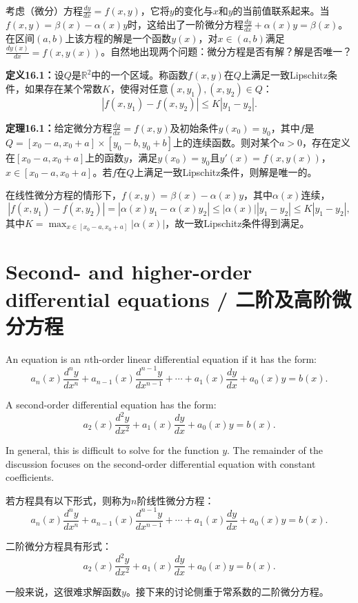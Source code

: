 \begin{translation}
考虑（微分）方程$\frac{dy}{dx} = f(x, y)$，它将$y$的变化与$x$和$y$的当前值联系起来。当$f(x, y) = \beta(x) - \alpha(x) y$时，这给出了一阶微分方程$\frac{dy}{dx} + \alpha(x)y = \beta(x)$。在区间$(a, b)$上该方程的解是一个函数$y(x)$，对$x \in (a, b)$满足$\frac{d y(x)}{dx} = f(x, y(x))$。自然地出现两个问题：微分方程是否有解？解是否唯一？

\textbf{定义16.1：}设$Q$是$\mathbb{R}^2$中的一个区域。称函数$f(x, y)$在$Q$上满足一致Lipschitz条件，如果存在某个常数$K$，使得对任意$(x, y_1), (x, y_2) \in Q$：
\[
|f(x, y_1) - f(x, y_2)| \leq K |y_1 - y_2|.
\]

\textbf{定理16.1：}给定微分方程$\frac{dy}{dx} = f(x, y)$及初始条件$y(x_0) = y_0$，其中$f$是$Q = [x_0 - a, x_0 + a] \times [y_0 - b, y_0 + b]$上的连续函数。则对某个$a > 0$，存在定义在$[x_0 - a, x_0 + a]$上的函数$y$，满足$y(x_0) = y_0$且$y'(x) = f(x, y(x))$，$x \in [x_0 - a, x_0 + a]$。若$f$在$Q$上满足一致Lipschitz条件，则解是唯一的。

在线性微分方程的情形下，$f(x, y) = \beta(x) - \alpha(x)y$，其中$\alpha(x)$连续，
\[
|f(x, y_1) - f(x, y_2)| = |\alpha(x)y_1 - \alpha(x)y_2| \leq |\alpha(x)| |y_1 - y_2| \leq K |y_1 - y_2|,
\]
其中$K = \max_{x \in [x_0-a, x_0+a]} |\alpha(x)|$，故一致Lipschitz条件得到满足。
\end{translation}

\section{Second- and higher-order differential equations / 二阶及高阶微分方程}

\begin{original}
An equation is an $n$th-order linear differential equation if it has the form:
\[
a_n(x)\frac{d^n y}{dx^n} + a_{n-1}(x)\frac{d^{n-1} y}{dx^{n-1}} + \cdots + a_1(x)\frac{dy}{dx} + a_0(x)y = b(x).
\]

A second-order differential equation has the form:
\[
a_2(x)\frac{d^2 y}{dx^2} + a_1(x)\frac{dy}{dx} + a_0(x)y = b(x).
\]

In general, this is difficult to solve for the function $y$. The remainder of the discussion focuses on the second-order differential equation with constant coefficients.
\end{original}
\begin{translation}
若方程具有以下形式，则称为$n$阶线性微分方程：
\[
a_n(x)\frac{d^n y}{dx^n} + a_{n-1}(x)\frac{d^{n-1} y}{dx^{n-1}} + \cdots + a_1(x)\frac{dy}{dx} + a_0(x)y = b(x).
\]

二阶微分方程具有形式：
\[
a_2(x)\frac{d^2 y}{dx^2} + a_1(x)\frac{dy}{dx} + a_0(x)y = b(x).
\]

一般来说，这很难求解函数$y$。接下来的讨论侧重于常系数的二阶微分方程。
\end{translation}

